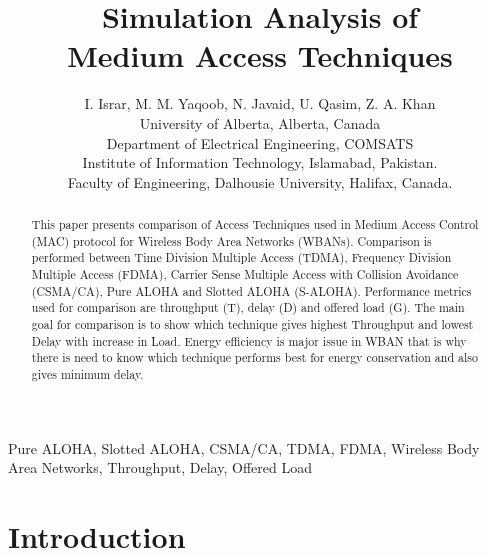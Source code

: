 \documentclass[10pt, conference, compsocconf]{IEEEtran}
\begin{document}
\title{Simulation Analysis of\\ Medium Access Techniques}


\author{I. Israr, M. M. Yaqoob, N. Javaid, U. Qasim, Z. A. Khan\\

        University of Alberta, Alberta, Canada\\
        Department of Electrical Engineering, COMSATS\\ Institute of
        Information Technology, Islamabad, Pakistan. \\
        Faculty of Engineering, Dalhousie University, Halifax, Canada.
        }

\maketitle


\begin{abstract}
This paper presents comparison of Access Techniques used in Medium Access Control (MAC) protocol for Wireless Body Area Networks (WBANs). Comparison is performed between Time Division Multiple Access (TDMA), Frequency Division Multiple Access (FDMA), Carrier Sense Multiple Access with Collision Avoidance (CSMA/CA), Pure ALOHA and Slotted ALOHA (S-ALOHA). Performance metrics used for comparison are throughput (T), delay (D) and offered load (G). The main goal for comparison is to show which technique gives highest Throughput and lowest Delay with increase in Load. Energy efficiency is major issue in WBAN that is why there is need to know which technique performs best for energy conservation and also gives minimum delay.
\end{abstract}


\begin{IEEEkeywords}
Pure ALOHA, Slotted ALOHA, CSMA/CA, TDMA, FDMA, Wireless Body Area Networks, Throughput, Delay, Offered Load
\end{IEEEkeywords}

\section{Introduction}
\end{document}
